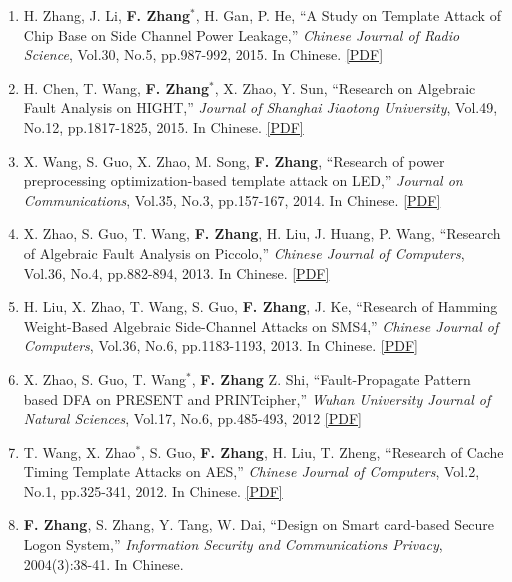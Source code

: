 \documentclass[11pt]{article}
\begin{document}
\begin{enumerate}
\item H. Zhang, J. Li, {\bf F. Zhang}$^\ast$, H. Gan, P. He, ``A Study on Template Attack of Chip Base on Side Channel Power Leakage,'' {\it Chinese Journal of Radio Science}, Vol.30, No.5, pp.987-992, 2015. In Chinese. \href{http://www.isee.zju.edu.cn/fanzhang/publications/2015\_CJRS\_Template.pdf}{[PDF]}

\item H. Chen, T. Wang, {\bf F. Zhang}$^\ast$, X. Zhao, Y. Sun, ``Research on Algebraic Fault Analysis on HIGHT,'' {\it Journal of Shanghai Jiaotong University}, Vol.49, No.12, pp.1817-1825, 2015. In Chinese. \href{http://www.isee.zju.edu.cn/fanzhang/publications/2015\_JoSJTU\_HIGHT.pdf}{[PDF]}

\item X. Wang, S. Guo, X. Zhao, M. Song, {\bf F. Zhang}, ``Research of power preprocessing optimization-based template attack on LED,'' {\it Journal on Communications}, Vol.35, No.3, pp.157-167, 2014. In Chinese. \href{http://www.isee.zju.edu.cn/fanzhang/publications/2014\_JoComm\_LED.pdf}{[PDF]}

\item X. Zhao, S. Guo, T. Wang, {\bf F. Zhang}, H. Liu, J. Huang, P. Wang, ``Research of Algebraic Fault Analysis on Piccolo,'' {\it Chinese Journal of Computers}, Vol.36, No.4, pp.882-894, 2013. In Chinese. \href{http://www.isee.zju.edu.cn/fanzhang/publications/2013\_CJComputers\_Piccolo.pdf}{[PDF]}

\item H. Liu, X. Zhao, T. Wang, S. Guo, {\bf F. Zhang}, J. Ke, ``Research of Hamming Weight-Based Algebraic Side-Channel Attacks on SMS4,'' {\it Chinese Journal of Computers}, Vol.36, No.6, pp.1183-1193, 2013. In Chinese. \href{http://www.isee.zju.edu.cn/fanzhang/publications/2013\_CJComputers\_SMS4.pdf}{[PDF]}

\item X. Zhao, S. Guo, T. Wang$^\ast$, {\bf F. Zhang} Z. Shi, ``Fault-Propagate Pattern based DFA on PRESENT and PRINTcipher,'' {\it Wuhan University Journal of Natural Sciences}, Vol.17, No.6, pp.485-493, 2012 \href{http://www.isee.zju.edu.cn/fanzhang/publications/2012\_wuhan\_FPPDFA.pdf}{[PDF]}

\item T. Wang, X. Zhao$^\ast$, S. Guo, {\bf F. Zhang}, H. Liu, T. Zheng, ``Research of Cache Timing Template Attacks on AES,'' {\it Chinese Journal of Computers}, Vol.2, No.1, pp.325-341, 2012. In Chinese. \href{http://www.isee.zju.edu.cn/fanzhang/publications/2012\_CJComputers\_cachetiming.pdf}{[PDF]}

\item {\bf F. Zhang}, S. Zhang, Y. Tang, W. Dai, ``Design on Smart card-based Secure Logon System,'' {\it Information Security and Communications Privacy}, 2004(3):38-41. In Chinese.
\end{enumerate}
\end{document}

